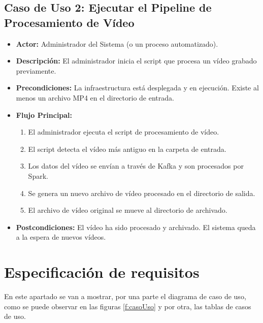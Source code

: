 \subsection{Caso de Uso 2: Ejecutar el Pipeline de Procesamiento de Vídeo}
\begin{itemize}
    \item \textbf{Actor:} Administrador del Sistema (o un proceso automatizado).
    \item \textbf{Descripción:} El administrador inicia el script que procesa un vídeo grabado previamente.
    \item \textbf{Precondiciones:} La infraestructura está desplegada y en ejecución. Existe al menos un archivo MP4 en el directorio de entrada.
    \item \textbf{Flujo Principal:}
        \begin{enumerate}
            \item El administrador ejecuta el script de procesamiento de vídeo.
            \item El script detecta el vídeo más antiguo en la carpeta de entrada.
            \item Los datos del vídeo se envían a través de Kafka y son procesados por Spark.
            \item Se genera un nuevo archivo de vídeo procesado en el directorio de salida.
            \item El archivo de vídeo original se mueve al directorio de archivado.
        \end{enumerate}
    \item \textbf{Postcondiciones:} El vídeo ha sido procesado y archivado. El sistema queda a la espera de nuevos vídeos.
\end{itemize}

\section{Especificación de requisitos}
En este apartado se van a mostrar, por una parte el diagrama de caso de uso, como se puede observar en las figuras  \ref{f:casoUso} y por otra, las tablas de casos de uso.


